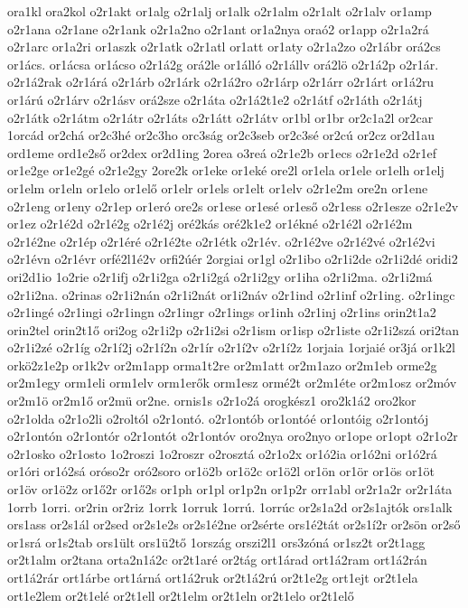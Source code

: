 {ora1kl
ora2kol
o2r1akt
or1alg
o2r1alj
or1alk
o2r1alm
o2r1alt
o2r1alv
or1amp
o2r1ana
o2r1ane
o2r1ank
o2r1a2no
o2r1ant
or1a2nya
oraó2
or1app
o2r1a2rá
o2r1arc
or1a2ri
or1aszk
o2r1atk
o2r1atl
or1att
or1aty
o2r1a2zo
o2r1ábr
orá2cs
or1ács.
or1ácsa
or1ácso
o2r1á2g
orá2le
or1álló
o2r1állv
orá2lö
o2r1á2p
o2r1ár.
o2r1á2rak
o2r1árá
o2r1árb
o2r1árk
o2r1á2ro
o2r1árp
o2r1árr
o2r1árt
or1á2ru
or1árú
o2r1árv
o2r1ásv
orá2sze
o2r1áta
o2r1á2t1e2
o2r1átf
o2r1áth
o2r1átj
o2r1átk
o2r1átm
o2r1átr
o2r1áts
o2r1átt
o2r1átv
or1bl
or1br
or2c1a2l
or2car
1orcád
or2chá
or2c3hé
or2c3ho
orc3ság
or2c3seb
or2c3sé
or2cú
or2cz
or2d1au
ord1eme
ord1e2ső
or2dex
or2d1ing
2orea
o3reá
o2r1e2b
or1ecs
o2r1e2d
o2r1ef
or1e2ge
or1e2gé
o2r1e2gy
2ore2k
or1eke
or1eké
ore2l
or1ela
or1ele
or1elh
or1elj
or1elm
or1eln
or1elo
or1elő
or1elr
or1els
or1elt
or1elv
o2r1e2m
ore2n
or1ene
o2r1eng
or1eny
o2r1ep
or1eró
ore2s
or1ese
or1esé
or1eső
o2r1ess
o2r1esze
o2r1e2v
or1ez
o2r1é2d
o2r1é2g
o2r1é2j
oré2kás
oré2k1e2
or1ékné
o2r1é2l
o2r1é2m
o2r1é2ne
o2r1ép
o2r1éré
o2r1é2te
o2r1étk
o2r1év.
o2r1é2ve
o2r1é2vé
o2r1é2vi
o2r1évn
o2r1évr
orfé2l1é2v
orfi2úér
2orgiai
or1gl
o2r1ibo
o2r1i2de
o2r1i2dé
oridi2
ori2d1io
1o2rie
o2r1ifj
o2r1i2ga
o2r1i2gá
o2r1i2gy
or1iha
o2r1i2ma.
o2r1i2má
o2r1i2na.
o2rinas
o2r1i2nán
o2r1i2nát
or1i2náv
o2r1ind
o2r1inf
o2r1ing.
o2r1ingc
o2r1ingé
o2r1ingi
o2r1ingn
o2r1ingr
o2r1ings
or1inh
o2r1inj
o2r1ins
orin2t1a2
orin2tel
orin2t1ő
ori2og
o2r1i2p
o2r1i2si
o2r1ism
or1isp
o2r1iste
o2r1i2szá
ori2tan
o2r1i2zé
o2r1íg
o2r1í2j
o2r1í2n
o2r1ír
o2r1í2v
o2r1í2z
1orjaia
1orjaié
or3já
or1k2l
orkö2z1e2p
or1k2v
or2m1app
orma1t2re
or2m1att
or2m1azo
or2m1eb
orme2g
or2m1egy
orm1eli
orm1elv
orm1erők
orm1esz
ormé2t
or2m1éte
or2m1osz
or2móv
or2m1ö
or2m1ő
or2mü
or2ne.
ornis1s
o2r1o2á
orogkész1
oro2k1á2
oro2kor
o2r1olda
o2r1o2li
o2roltól
o2r1ontó.
o2r1ontób
or1ontóé
or1ontóig
o2r1ontój
o2r1ontón
o2r1ontór
o2r1ontót
o2r1ontóv
oro2nya
oro2nyo
or1ope
or1opt
o2r1o2r
o2r1osko
o2r1osto
1o2roszi
1o2roszr
o2rosztá
o2r1o2x
or1ó2ia
or1ó2ni
or1ó2rá
or1óri
or1ó2sá
oróso2r
oró2soro
or1ö2b
or1ö2c
or1ö2l
or1ön
or1ör
or1ös
or1öt
or1öv
or1ö2z
or1ő2r
or1ő2s
or1ph
or1pl
or1p2n
or1p2r
orr1abl
or2r1a2r
or2r1áta
1orrb
1orri.
or2rin
or2riz
1orrk
1orruk
1orrú.
1orrúc
or2s1a2d
or2s1ajtók
ors1alk
ors1ass
or2s1ál
or2sed
or2s1e2s
or2s1é2ne
or2sérte
ors1é2tát
or2s1í2r
or2sön
or2ső
or1srá
or1s2tab
ors1ült
ors1ü2tő
1ország
orszi2l1
ors3zóná
or1sz2t
or2t1agg
or2t1alm
or2tana
orta2n1á2c
or2t1aré
or2tág
ort1árad
ort1á2ram
ort1á2rán
ort1á2rár
ort1árbe
ort1árná
ort1á2ruk
or2t1á2rú
or2t1e2g
ort1ejt
or2t1ela
ort1e2lem
or2t1elé
or2t1ell
or2t1elm
or2t1eln
or2t1elo
or2t1elő
}

